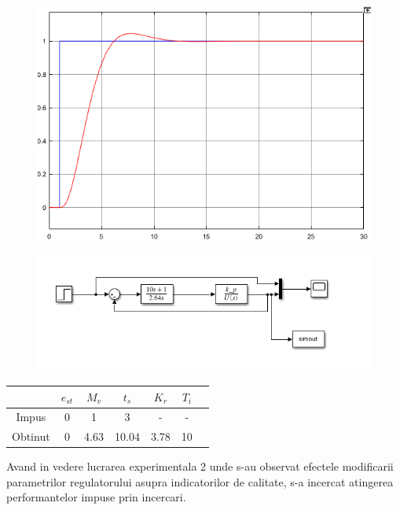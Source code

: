 \documentclass[11pt]{article}
\begin{document}
\begin{figure}[H]
	\centering
	\begin{minipage}{.4\textwidth}
		\centering
		\includegraphics[width=.9\linewidth]{CMVK.png}
		\label{fig:test1}
	\end{minipage}%
	\begin{minipage}{.6\textwidth}
		\centering
		\includegraphics[width=.9\linewidth]{sim_cmvk.png}
		\label{fig:test2}
	\end{minipage}
\end{figure}
\begin{center}
	\begin{tabular}{|c|c|c|c|c|c|c|}
		\hline
		&$e_{st}$&$M_v$&$t_s$&$K_r$&$T_i$\\
		\hline
		Impus&0&1&3&-&-\\
		\hline
		Obtinut&0&4.63&10.04&3.78&10\\
		\hline
	\end{tabular}
\end{center}
Avand in vedere lucrarea experimentala 2 unde s-au observat efectele modificarii parametrilor regulatorului asupra indicatorilor de calitate, s-a incercat atingerea performantelor impuse prin incercari.
\end{document}
